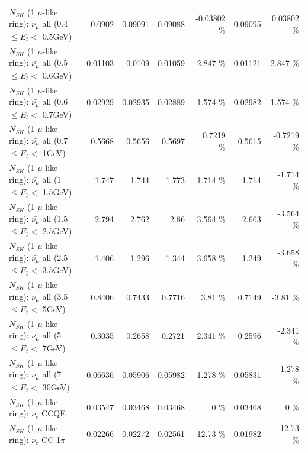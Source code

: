 \begin{table}
\begin{tabular}{| l | r | r | r  r | r  r |}
 $N_{SK}$ (1 $\mu$-like ring): $\bar{\nu_{\mu}}$ all (0.4 $\leq E_{t} <$ 0.5GeV) &          0.0902 &         0.09091 &         0.09088 & -0.03802 \%  &         0.09095 &  0.03802 \%  \\ 
 $N_{SK}$ (1 $\mu$-like ring): $\bar{\nu_{\mu}}$ all (0.5 $\leq E_{t} <$ 0.6GeV) &         0.01103 &          0.0109 &         0.01059 &   -2.847 \%  &         0.01121 &    2.847 \%  \\ 
 $N_{SK}$ (1 $\mu$-like ring): $\bar{\nu_{\mu}}$ all (0.6 $\leq E_{t} <$ 0.7GeV) &         0.02929 &         0.02935 &         0.02889 &   -1.574 \%  &         0.02982 &    1.574 \%  \\ 
   $N_{SK}$ (1 $\mu$-like ring): $\bar{\nu_{\mu}}$ all (0.7 $\leq E_{t} <$ 1GeV) &          0.5668 &          0.5656 &          0.5697 &   0.7219 \%  &          0.5615 &  -0.7219 \%  \\ 
   $N_{SK}$ (1 $\mu$-like ring): $\bar{\nu_{\mu}}$ all (1 $\leq E_{t} <$ 1.5GeV) &           1.747 &           1.744 &           1.773 &    1.714 \%  &           1.714 &   -1.714 \%  \\ 
 $N_{SK}$ (1 $\mu$-like ring): $\bar{\nu_{\mu}}$ all (1.5 $\leq E_{t} <$ 2.5GeV) &           2.794 &           2.762 &            2.86 &    3.564 \%  &           2.663 &   -3.564 \%  \\ 
 $N_{SK}$ (1 $\mu$-like ring): $\bar{\nu_{\mu}}$ all (2.5 $\leq E_{t} <$ 3.5GeV) &           1.406 &           1.296 &           1.344 &    3.658 \%  &           1.249 &   -3.658 \%  \\ 
   $N_{SK}$ (1 $\mu$-like ring): $\bar{\nu_{\mu}}$ all (3.5 $\leq E_{t} <$ 5GeV) &          0.8406 &          0.7433 &          0.7716 &     3.81 \%  &          0.7149 &    -3.81 \%  \\ 
     $N_{SK}$ (1 $\mu$-like ring): $\bar{\nu_{\mu}}$ all (5 $\leq E_{t} <$ 7GeV) &          0.3035 &          0.2658 &          0.2721 &    2.341 \%  &          0.2596 &   -2.341 \%  \\ 
    $N_{SK}$ (1 $\mu$-like ring): $\bar{\nu_{\mu}}$ all (7 $\leq E_{t} <$ 30GeV) &         0.06636 &         0.05906 &         0.05982 &    1.278 \%  &         0.05831 &   -1.278 \%  \\ 
\hline
\hline
\hline
                                      $N_{SK}$ (1 $\mu$-like ring): $\nu_e$ CCQE &         0.03547 &         0.03468 &         0.03468 &        0 \%  &         0.03468 &        0 \%  \\ 
                                 $N_{SK}$ (1 $\mu$-like ring): $\nu_e$ CC 1$\pi$ &         0.02266 &         0.02272 &         0.02561 &    12.73 \%  &         0.01982 &   -12.73 \%  \\ 

\end{tabular}
\end{table}
